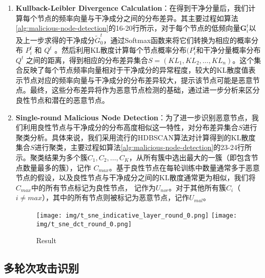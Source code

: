 \documentclass[lettersize,journal]{IEEEtran}
\begin{document}
\begin{enumerate}
\item \textbf{Kullback-Leibler Divergence Calculation}：在得到干净分量后，我们计算每个节点的频率向量与干净成分之间的分布差异。其主要过程如算法\ref{alg:malicious-node-detection}的16-20行所示，对于每个节点的低频向量\(\mathbf{G}_i^t\)以及上一步求得的干净成分\(\tilde{G}^t_0\)，通过Softmax函数来将它们转换为相应的概率分布 \(P_i^t\) 和 \(Q^t\) 。然后利用KL散度计算每个节点概率分布\((P_i^t\)和干净分量概率分布 \(Q^t\) 之间的距离，得到相应的分布差异集合\(S = ({{KL}}_1, {{KL}}_2, \ldots, {{KL}}_n)\)。这个集合反映了每个节点频率向量相对于干净成分的异常程度，较大的KL散度值表示节点对应的频率向量与干净成分的分布差异较大，提示该节点可能是恶意节点。最终，这些分布差异将作为恶意节点检测的基础，通过进一步分析来区分良性节点和潜在的恶意节点。





\item \textbf{Single-round Malicious Node Detection}：为了进一步识别恶意节点，我们利用良性节点与干净成分的分布高度相似这一特性，对分布差异集合$S$进行聚类分析。具体来说，我们采用流行的HDBSCAN算法对计算得到的KL散度集合$S$进行聚类，主要过程如算法\ref{alg:malicious-node-detection}的23-24行所示。聚类结果为多个簇\(C_1, C_2, \ldots, C_K\)，从所有簇中选出最大的一簇（即包含节点数量最多的簇），记作 \(C_{max}\)。基于良性节点在每轮训练中数量通常多于恶意节点的假设，以及良性节点与干净成分之间的KL散度通常更为相似，我们将 \(C_{max}\)中的所有节点标记为良性节点， 记作为\(U_{nor}\)。对于其他所有簇\(C_i\)（\(i \neq {max}\)），其中的所有节点则被标记为恶意节点，记作\(U_{mal}\)。  


\begin{figure}[htbp]
    \centering
    \texttt{[image: img/t\_sne\_indicative\_layer\_round\_0.png]}
    \hspace{0.1in}
    \texttt{[image: img/t\_sne\_dct\_round\_0.png]}
    \caption{Result}
\end{figure}


\end{enumerate}

\subsection{多轮次攻击识别}
\end{document}
